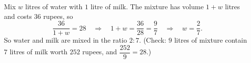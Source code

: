 Mix $w$ litres of water with $1$ litre of milk. The mixture has volume $1+w$ litres and costs $36$ rupees, so
\[\dfrac{36}{1+w}=28\quad\Longrightarrow\quad1+w=\dfrac{36}{28}=\dfrac97\quad\Longrightarrow\quad w=\dfrac27.\]
So water and milk are mixed in the ratio $\boxed{2:7}$. (Check: $9$ litres of mixture contain $7$ litres of milk worth $252$ rupees, and $\dfrac{252}{9}=28$.)
